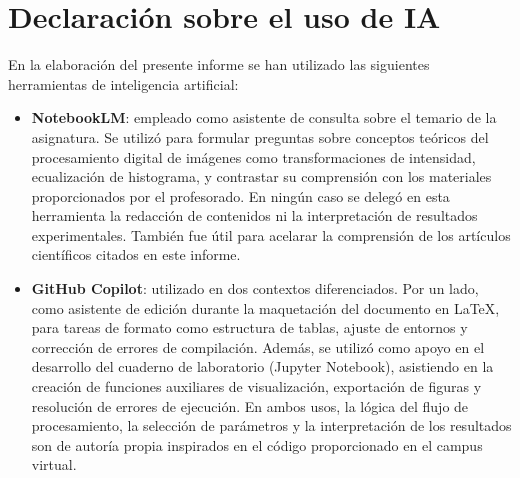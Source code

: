 \documentclass[12pt,a4paper,twoside]{rho-class/rho}
\begin{document}

\section*{Declaración sobre el uso de IA}

    En la elaboración del presente informe se han utilizado las siguientes
    herramientas de inteligencia artificial:

    \begin{itemize}
        \item \textbf{NotebookLM}: empleado como asistente de
        consulta sobre el temario de la asignatura. Se utilizó para formular
        preguntas sobre conceptos teóricos del procesamiento digital de imágenes
        como transformaciones de intensidad, ecualización de histograma, 
        y contrastar su comprensión con los materiales
        proporcionados por el profesorado. En ningún caso se delegó en esta
        herramienta la redacción de contenidos ni la interpretación de resultados
        experimentales. También fue útil para acelarar la comprensión de los artículos 
        científicos citados en este informe.

        \item \textbf{GitHub Copilot}: utilizado en dos
        contextos diferenciados. Por un lado, como asistente de edición durante la
        maquetación del documento en \LaTeX{}, para tareas de formato
        como estructura de tablas, ajuste de entornos y corrección de
        errores de compilación. Además, se utilizó como apoyo en el
        desarrollo del cuaderno de laboratorio (Jupyter Notebook), asistiendo en
        la creación de funciones auxiliares de visualización, exportación de
        figuras y resolución de errores de ejecución. En ambos usos, la lógica del
        flujo de procesamiento, la selección de parámetros y la interpretación
        de los resultados son de autoría propia inspirados en el código proporcionado en el campus virtual.
    \end{itemize}


\printbibliography

\end{document}
